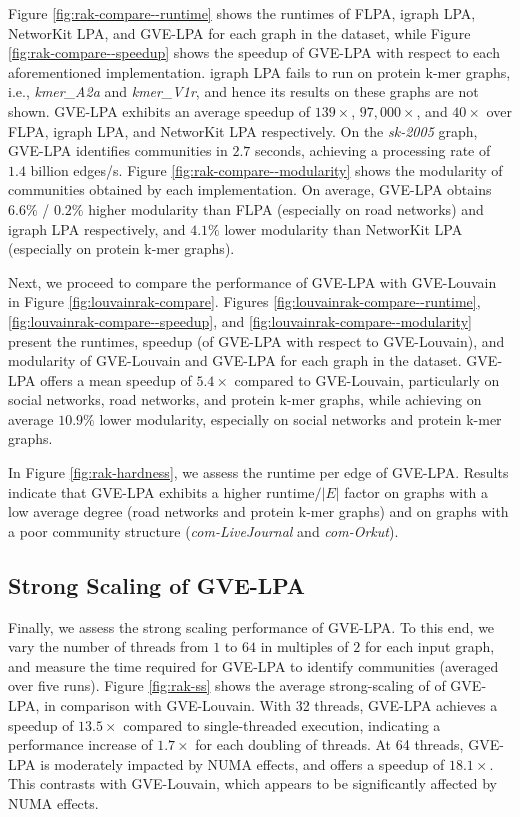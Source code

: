Figure \ref{fig:rak-compare--runtime} shows the runtimes of FLPA, igraph LPA, NetworKit LPA, and GVE-LPA for each graph in the dataset, while Figure \ref{fig:rak-compare--speedup} shows the speedup of GVE-LPA with respect to each aforementioned implementation. igraph LPA fails to run on protein k-mer graphs, i.e., \textit{kmer\_A2a} and \textit{kmer\_V1r}, and hence its results on these graphs are not shown. GVE-LPA exhibits an average speedup of $139\times$, $97,000\times$, and $40\times$ over FLPA, igraph LPA, and NetworKit LPA respectively. On the \textit{sk-2005} graph, GVE-LPA identifies communities in $2.7$ seconds, achieving a processing rate of $1.4$ billion edges/s. Figure \ref{fig:rak-compare--modularity} shows the modularity of communities obtained by each implementation. On average, GVE-LPA obtains $6.6\%$ / $0.2\%$ higher modularity than FLPA (especially on road networks) and igraph LPA respectively, and $4.1\%$ lower modularity than NetworKit LPA (especially on protein k-mer graphs).




Next, we proceed to compare the performance of GVE-LPA with GVE-Louvain in Figure \ref{fig:louvainrak-compare}. Figures \ref{fig:louvainrak-compare--runtime}, \ref{fig:louvainrak-compare--speedup}, and \ref{fig:louvainrak-compare--modularity} present the runtimes, speedup (of GVE-LPA with respect to GVE-Louvain), and modularity of GVE-Louvain and GVE-LPA for each graph in the dataset. GVE-LPA offers a mean speedup of $5.4\times$ compared to GVE-Louvain, particularly on social networks, road networks, and protein k-mer graphs, while achieving on average $10.9\%$ lower modularity, especially on social networks and protein k-mer graphs.

In Figure \ref{fig:rak-hardness}, we assess the runtime per edge of GVE-LPA. Results indicate that GVE-LPA exhibits a higher $\text{runtime}/|E|$ factor on graphs with a low average degree (road networks and protein k-mer graphs) and on graphs with a poor community structure (\textit{com-LiveJournal} and \textit{com-Orkut}).




\subsection{Strong Scaling of GVE-LPA}

Finally, we assess the strong scaling performance of GVE-LPA. To this end, we vary the number of threads from $1$ to $64$ in multiples of $2$ for each input graph, and measure the time required for GVE-LPA to identify communities (averaged over five runs). Figure \ref{fig:rak-ss} shows the average strong-scaling of of GVE-LPA, in comparison with GVE-Louvain. With 32 threads, GVE-LPA achieves a speedup of $13.5\times$ compared to single-threaded execution, indicating a performance increase of $1.7\times$ for each doubling of threads. At 64 threads, GVE-LPA is moderately impacted by NUMA effects, and offers a speedup of $18.1\times$. This contrasts with GVE-Louvain, which appears to be significantly affected by NUMA effects.
